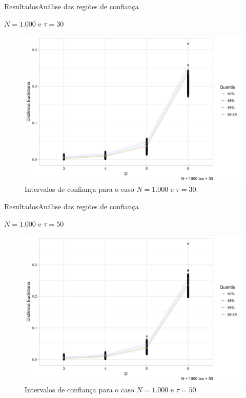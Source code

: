 \documentclass[10pt,xcolor={dvipsnames}]{beamer}
\begin{document}
\begin{frame}{Resultados}{Análise das regiões de confiança}
	\begin{block}{$N=1.000$ e $\tau=30$}
	\begin{figure}
		\centering
		\includegraphics[width=.7\linewidth]{Conf_Int_1k_T30_noMT}
		\caption{Intervalos de confiança para o caso $N=1.000$ e $\tau=30$.}\label{Fig:Conf_Int_1k_30}
	\end{figure}
	\end{block}
\end{frame}

\begin{frame}{Resultados}{Análise das regiões de confiança}
	\begin{block}{$N=1.000$ e $\tau=50$}
	\begin{figure}
		\centering
		\includegraphics[width=.7\linewidth]{Conf_Int_1k_T50_noMT}
		\caption{Intervalos de confiança para o caso $N=1.000$ e $\tau=50$.}\label{Fig:Conf_Int_1k_T50}
	\end{figure}
	\end{block}
\end{frame}
\end{document}
